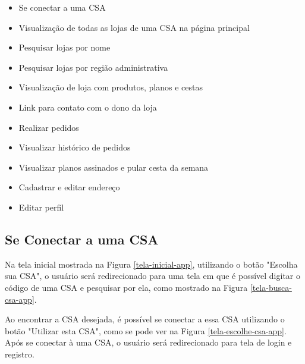 \begin{itemize}
    \item Se conectar a uma CSA
    \item Visualização de todas as lojas de uma CSA na página principal
    \item Pesquisar lojas por nome
    \item Pesquisar lojas por região administrativa
    \item Visualização de loja com produtos, planos e cestas
    \item Link para contato com o dono da loja
    \item Realizar pedidos
    \item Visualizar histórico de pedidos
    \item Visualizar planos assinados e pular cesta da semana
    \item Cadastrar e editar endereço
    \item Editar perfil
\end{itemize}

\subsection{Se Conectar a uma CSA}
Na tela inicial mostrada na Figura \ref{tela-inicial-app}, utilizando o botão "Escolha sua CSA", o usuário será redirecionado para uma tela em que é possível digitar o código de uma CSA e pesquisar por ela, como mostrado na Figura \ref{tela-busca-csa-app}.

Ao encontrar a CSA desejada, é possível se conectar a essa CSA utilizando o botão "Utilizar esta CSA", como se pode ver na Figura \ref{tela-escolhe-csa-app}. Após se conectar à uma CSA, o usuário será redirecionado para tela de login e registro.

